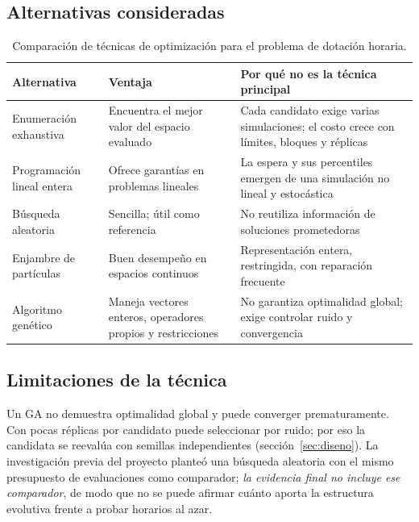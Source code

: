 \subsection{Alternativas consideradas}
\begin{table}[ht]
\centering\small
\caption{Comparación de técnicas de optimización para el problema de dotación horaria.}
\label{tab:alternativas}
\begin{tabularx}{\linewidth}{@{}l X X@{}}
\toprule
Alternativa & Ventaja & Por qué no es la técnica principal \\
\midrule
Enumeración exhaustiva & Encuentra el mejor valor del espacio evaluado & Cada candidato exige varias simulaciones; el costo crece con límites, bloques y réplicas \\
Programación lineal entera & Ofrece garantías en problemas lineales & La espera y sus percentiles emergen de una simulación no lineal y estocástica \\
Búsqueda aleatoria & Sencilla; útil como referencia & No reutiliza información de soluciones prometedoras \\
Enjambre de partículas & Buen desempeño en espacios continuos & Representación entera, restringida, con reparación frecuente \\
Algoritmo genético & Maneja vectores enteros, operadores propios y restricciones & No garantiza optimalidad global; exige controlar ruido y convergencia \\
\bottomrule
\end{tabularx}
\end{table}

\subsection{Limitaciones de la técnica}
Un GA no demuestra optimalidad global y puede converger prematuramente. Con pocas
réplicas por candidato puede seleccionar por ruido; por eso la candidata se reevalúa con
semillas independientes (sección~\ref{sec:diseno}). La investigación previa del proyecto
planteó una búsqueda aleatoria con el mismo presupuesto de evaluaciones como comparador;
\emph{la evidencia final no incluye ese comparador}, de modo que no se puede afirmar cuánto
aporta la estructura evolutiva frente a probar horarios al azar.
